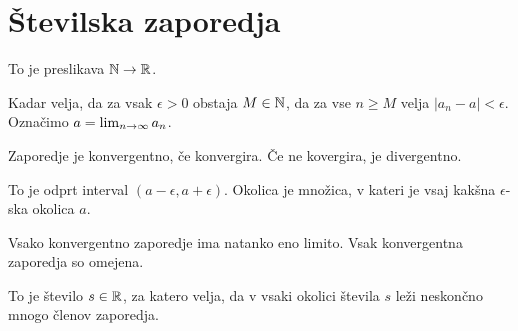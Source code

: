 \section{Številska zaporedja}


To je preslikava $\mathbb{N} \to \mathbb{R}$.


Kadar velja, da za vsak $\epsilon > 0$ obstaja $M \in \mathbb{N}$, da za vse $n \ge M$ velja $|a_n - a| < \epsilon$. Označimo $a = \lim_{n\to \infty} a_n$.


Zaporedje je konvergentno, če konvergira. Če ne kovergira, je divergentno.


To je odprt interval $(a-\epsilon, a+\epsilon)$. Okolica je množica, v kateri je vsaj kakšna $\epsilon$-ska okolica $a$.


Vsako konvergentno zaporedje ima natanko eno limito. Vsak konvergentna zaporedja so omejena.


To je število $s \in \mathbb{R}$, za katero velja, da v vsaki okolici števila $s$ leži neskončno mnogo členov zaporedja.